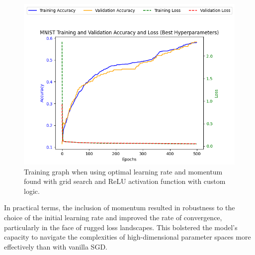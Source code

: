 \documentclass[letterpaper]{article}
\begin{document}
    

\begin{figure}[h]
    \centering
    \includegraphics[width=0.8\linewidth]{momentum_grid_search.png} %
    \caption{Training graph when using optimal learning rate and momentum found with grid search and ReLU activation function with custom logic.}
    \label{fig:momentum_grid_search}
\end{figure}

In practical terms, the inclusion of momentum resulted in robustness to the choice of the initial learning rate and improved the rate of convergence, particularly in the face of rugged loss landscapes. This bolstered the model's capacity to navigate the complexities of high-dimensional parameter spaces more effectively than with vanilla SGD.
\end{document}

